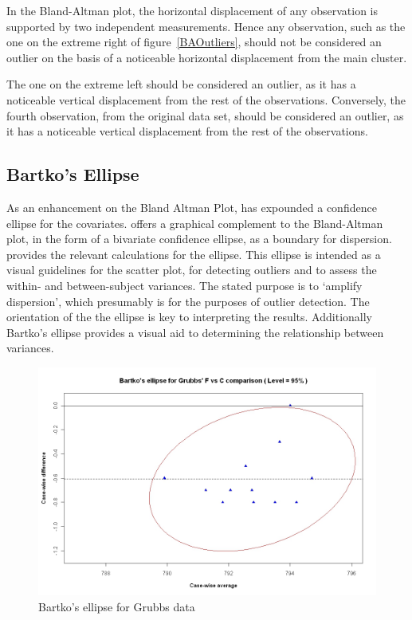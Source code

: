 \documentclass[12pt, a4paper]{report}
\theoremstyle{plain}
\theoremstyle{definition}
\theoremstyle{remark}
\begin{document}
In the Bland-Altman plot, the horizontal displacement of any observation is supported by two independent measurements. Hence any observation, such as the one on the extreme right of figure~\ref{BAOutliers}, should not be considered an outlier on the basis of a noticeable horizontal displacement from the main cluster. 

The one	on the extreme left should be considered an outlier, as it has a noticeable vertical displacement from the rest of the observations. Conversely, the fourth observation, from the original data set, should be considered an outlier, as it has a noticeable vertical displacement from the rest of the observations.








\subsection{Bartko's Ellipse}




As an enhancement on the Bland Altman Plot, \citet{Bartko} has
expounded a confidence ellipse for the covariates. \citet{Bartko} offers a graphical complement to the Bland-Altman
plot, in the form of a bivariate confidence ellipse, as a boundary for dispersion. \citet{AltmanEllipse} provides the relevant calculations for the ellipse. This ellipse is intended as a visual
guidelines for the scatter plot, for detecting outliers and to
assess the within- and between-subject variances. The stated purpose is to `amplify dispersion', which presumably is for the purposes of outlier detection. The orientation of the the ellipse is key to interpreting the results.
Additionally Bartko's ellipse provides a visual aid to determining the
relationship between variances. 



\begin{figure}[h!]
	\includegraphics[width=130mm]{images/GrubbsBartko.jpeg}
	\caption{Bartko's ellipse for Grubbs data}\label{GrubbsBartko}
\end{figure}
\end{document}
